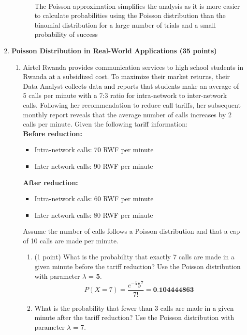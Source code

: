 \documentclass[a3paper,12pt]{article} %
\begin{document}
\begin{enumerate}
\begin{enumerate}
\begin{enumerate}
            \\ The Poisson approximation simplifies the analysis as it is more easier to calculate probabilities using the Poisson distribution than the binomial distribution for a large number of trials and a small probability of success
        \end{enumerate}
    \end{enumerate}
    \newpage
    \item \textbf{Poisson Distribution in Real-World Applications (35 points)}
    \begin{enumerate}
        \item Airtel Rwanda provides communication services to high school students in Rwanda at a subsidized cost. To maximize their market returns, their Data Analyst collects data and reports that students make an
        average of 5 calls per minute with a 7:3 ratio for intra-network to inter-network calls. Following her
        recommendation to reduce call tariffs, her subsequent monthly report reveals that the average number
        of calls increases by 2 calls per minute.
        Given the following tariff information:
        \\ \textbf{Before reduction:}
        \begin{itemize}
            \item Intra-network calls: 70 RWF per minute
            \item Inter-network calls: 90 RWF per minute
        \end{itemize}
        \textbf{After reduction:}
        \begin{itemize}
            \item Intra-network calls: 60 RWF per minute
            \item Inter-network calls: 80 RWF per minute
        \end{itemize}
        Assume the number of calls follows a Poisson distribution and that a cap of 10 calls are made per minute.
        \begin{enumerate}
            \item (1 point) What is the probability that exactly 7 calls are made in a given minute before the tariff reduction? Use the Poisson distribution with parameter \(\lambda\) = \textbf{5}.
            \[
                P(X = 7) = \frac{e^{-5} 5^7}{7!} = \textbf{0.104444863}
            \]
            \item What is the probability that fewer than 3 calls are made in a given minute after the tariff reduction? Use the Poisson distribution with parameter \(\lambda\) = 7.

\end{enumerate}
\end{enumerate}
\end{enumerate}
\end{document}
